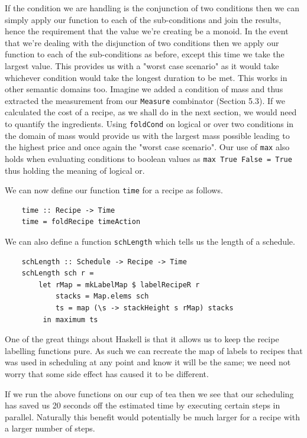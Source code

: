 \documentclass[11pt]{article}
\begin{document}
If the condition we are handling is the conjunction of two conditions then we can simply apply our function
to each of the sub-conditions and join the results, hence the requirement that the value we're
creating be a monoid. In the event that we're dealing with the disjunction of two conditions then
we apply our function to each of the sub-conditions as before, except this time we take the largest value.
This provides us with a "worst case scenario" as it would take whichever condition would take the longest
duration to be met. This works in other semantic domains too. Imagine we added a condition of mass and thus
extracted the measurement from our \texttt{Measure} combinator (Section 5.3). If we calculated the cost of a recipe, as we shall
do in the next section, we would need to quantify the ingredients. Using \texttt{foldCond} on logical or over two
conditions in the domain of mass would provide us with the largest mass possible leading to the highest price and
once again the "worst case scenario". Our use of \texttt{max} also holds when evaluating conditions to boolean values
as \texttt{max True False = True} thus holding the meaning of logical or.

\medbreak

We can now define our function \texttt{time} for a recipe as follows.

\begin{lstlisting}
    time :: Recipe -> Time
    time = foldRecipe timeAction
\end{lstlisting}

We can also define a function \texttt{schLength} which tells us the length of a schedule.

\begin{lstlisting}
    schLength :: Schedule -> Recipe -> Time
    schLength sch r =
        let rMap = mkLabelMap $ labelRecipeR r
            stacks = Map.elems sch
            ts = map (\s -> stackHeight s rMap) stacks
         in maximum ts
\end{lstlisting}

One of the great things about Haskell is that it allows us to keep the recipe labelling
functions pure. As such we can recreate the map of labels to recipes that was used in
scheduling at any point and know it will be the same; we need not worry that some side
effect has caused it to be different.

\medbreak

If we run the above functions on our cup of tea then we see that our scheduling has
saved us 20 seconds off the estimated time by executing certain steps in parallel. Naturally
this benefit would potentially be much larger for a recipe with a larger number of steps.
\end{document}
